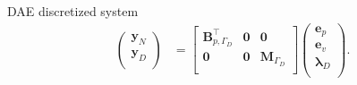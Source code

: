 \documentclass[aspectratio=169]{ISAE-Beamer}
\begin{document}
\begin{frame}{DAE discretized system}
\begin{equation*}
\begin{aligned}
\begin{pmatrix}
\mathbf{y}_N \\
\mathbf{y}_D \\
\end{pmatrix} &=
\begin{bmatrix}
\mathbf{B}_{p, \Gamma_D}^\top & \mathbf{0} & \mathbf{0}\\ 
\mathbf{0} & \mathbf{0} & \mathbf{M}_{\Gamma_D} \\ 
\end{bmatrix}
\begin{pmatrix}
{\mathbf{e}}_p\\
{\mathbf{e}}_v\\
{\bm{\lambda}}_D \\
\end{pmatrix}.
\end{aligned}
\end{equation*}

\end{frame}
\end{document}

